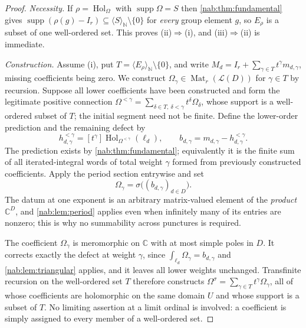 \documentclass[11pt,letterpaper]{article}
\theoremstyle{definition}
\theoremstyle{remark}
\newcommand{\C}{\mathbb C}
\newcommand{\N}{\mathbb N}
\newcommand{\LL}{\mathcal L}
\newcommand{\Mat}{\operatorname{Mat}}
\newcommand{\supp}{\operatorname{supp}}
\newcommand{\Hol}{\operatorname{Hol}}
\newcommand{\coeff}[1]{[t^{#1}]}
\newcommand{\angles}[1]{\langle #1\rangle_{\N}}
\numberwithin{equation}{section}
\begin{document}
\begin{proof}
\emph{Necessity.} If $\rho=\Hol_\Omega$ with $\supp\Omega=S$ then
\cref{nab:thm:fundamental} gives
$\supp(\rho(g)-I_r)\subseteq\angles S\setminus\{0\}$ for \emph{every} group
element $g$, so $E_\rho$ is a subset of one well-ordered set. This proves
(ii)$\Rightarrow$(i), and (iii)$\Rightarrow$(ii) is immediate.

\emph{Construction.} Assume (i), put $T=\angles{E_\rho}\setminus\{0\}$, and
write $M_d=I_r+\sum_{\gamma\in T}t^\gamma m_{d,\gamma}$, missing coefficients
being zero. We construct $\Omega_\gamma\in\Mat_r(\LL(D))$ for $\gamma\in T$ by
recursion. Suppose all lower coefficients have been constructed and form the
legitimate positive connection
$\Omega^{<\gamma}=\sum_{\delta\in T,\ \delta<\gamma}t^\delta\Omega_\delta$,
whose support is a well-ordered subset of $T$; the initial segment need not be
finite. Define the lower-order prediction and the remaining defect by
\begin{equation}\label{nab:eq:defect}
 h^{<\gamma}_{d,\gamma}=\coeff{\gamma}\Hol_{\Omega^{<\gamma}}(\ell_d),
 \qquad
 b_{d,\gamma}=m_{d,\gamma}-h^{<\gamma}_{d,\gamma}.
\end{equation}
The prediction exists by \cref{nab:thm:fundamental}; equivalently it is the
finite sum of all iterated-integral words of total weight $\gamma$ formed from
previously constructed coefficients. Apply the period section entrywise and
set
\begin{equation}\label{nab:eq:RHrecursion}
 \Omega_\gamma=\sigma\bigl((b_{d,\gamma})_{d\in D}\bigr).
\end{equation}
The datum at one exponent is an arbitrary matrix-valued element of the
\emph{product} $\C^D$, and \cref{nab:lem:period} applies even when infinitely
many of its entries are nonzero; this is why no summability across punctures is
required.

The coefficient $\Omega_\gamma$ is meromorphic on $\C$ with at most simple
poles in $D$. It corrects exactly the defect at weight $\gamma$, since
$\int_{\ell_d}\Omega_\gamma=b_{d,\gamma}$ and \cref{nab:lem:triangular}
applies, and it leaves all lower weights unchanged. Transfinite recursion on
the well-ordered set $T$ therefore constructs
$\Omega^\sigma=\sum_{\gamma\in T}t^\gamma\Omega_\gamma$, all of whose
coefficients are holomorphic on the same domain $U$ and whose support is a
subset of $T$. No limiting assertion at a limit ordinal is involved: a
coefficient is simply assigned to every member of a well-ordered set.


\end{proof}
\end{document}
